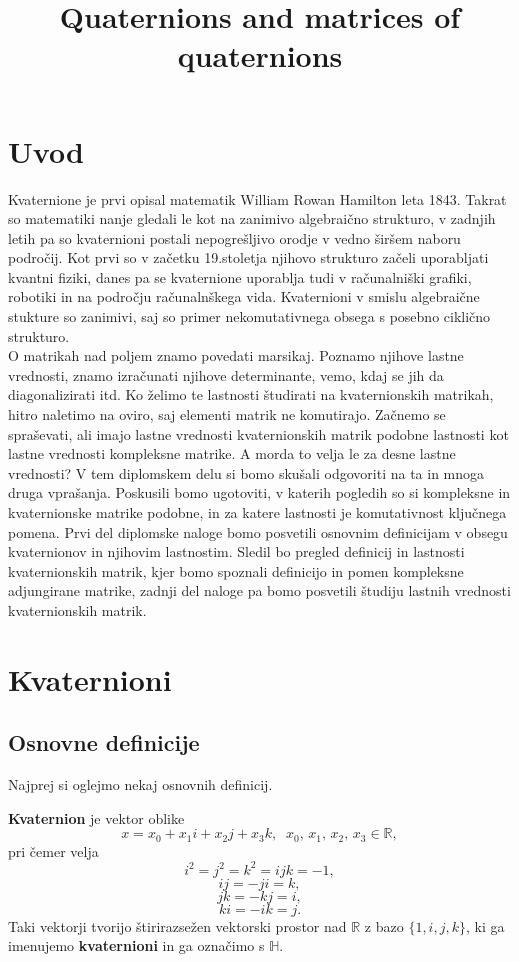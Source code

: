 \documentclass[mat1, tisk]{fmfdelo}
\title{Quaternions and matrices of quaternions}
\numberwithin{equation}{section}
\begin{document}
\nocite{zhang}


\section{Uvod}
Kvaternione je prvi opisal matematik William Rowan Hamilton leta 1843. Takrat so matematiki nanje gledali le kot na
zanimivo algebraično strukturo, v zadnjih letih pa so kvaternioni postali nepogrešljivo orodje v vedno širšem naboru 
področij. Kot prvi so v začetku 19.\@ stoletja njihovo strukturo začeli uporabljati kvantni fiziki, danes pa se kvaternione
uporablja tudi v računalniški grafiki, robotiki in na področju računalnškega vida. Kvaternioni v smislu algebraične 
stukture so zanimivi, saj so primer nekomutativnega obsega s posebno ciklično strukturo. \\


\noindent
O matrikah nad poljem znamo povedati marsikaj. Poznamo njihove lastne vrednosti, znamo izračunati njihove determinante, vemo,
kdaj se jih da diagonalizirati itd. Ko želimo te lastnosti študirati na kvaternionskih matrikah, hitro naletimo na oviro, 
saj elementi matrik ne komutirajo. Začnemo se spraševati, ali imajo lastne vrednosti kvaternionskih matrik podobne lastnosti kot lastne 
vrednosti kompleksne matrike. A morda to velja le za desne lastne vrednosti? V tem diplomskem delu si bomo skušali odgovoriti na ta in mnoga druga 
vprašanja. Poskusili bomo ugotoviti, v katerih pogledih so si kompleksne in kvaternionske matrike podobne, in za katere lastnosti
je komutativnost ključnega pomena. Prvi del diplomske naloge bomo posvetili osnovnim definicijam v obsegu kvaternionov in njihovim 
lastnostim. Sledil bo pregled definicij in lastnosti kvaternionskih matrik, kjer bomo spoznali definicijo in pomen kompleksne 
adjungirane matrike, zadnji del naloge pa bomo posvetili študiju lastnih vrednosti kvaternionskih matrik.

\newpage

\section{Kvaternioni}
\subsection{Osnovne definicije}

Najprej si oglejmo nekaj osnovnih definicij.

\begin{definicija}
    \textbf{Kvaternion} je vektor oblike 
        \[ x = x_{0} + x_{1}i + x_{2}j + x_{3}k, \; \; x_{0}, \, x_{1}, \, x_{2}, \, x_{3} \in \mathbb{R},\] 
        pri čemer velja
        $$i^2 = j^2 = k^2 = ijk = -1,$$
        $$ij = -ji = k,$$
        $$jk = -kj = i,$$
        $$ki = -ik = j.$$
        Taki vektorji tvorijo štirirazsežen vektorski prostor nad $\mathbb{R}$ z bazo $\{1, i, j, k\}$, ki ga imenujemo \textbf{kvaternioni} in ga označimo s $\mathbb{H}$.
\end{definicija}
\end{document}
